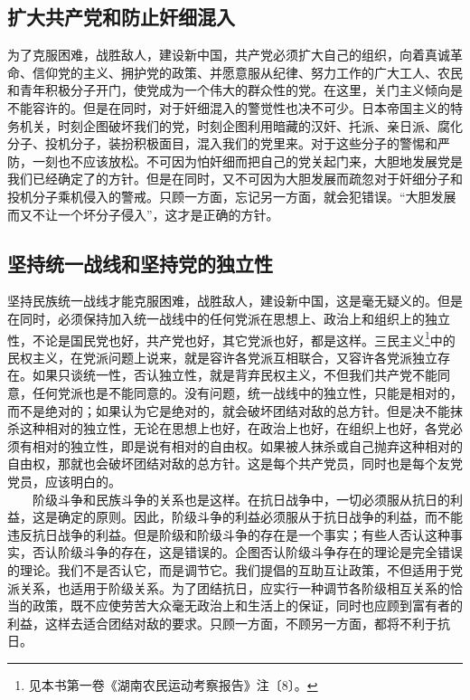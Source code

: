 \documentclass[cn,11pt,chinese]{elegantbook}
\def\myformat#1{\hfil\hfil #1}
\begin{document}
\subsection*{\myformat{扩大共产党和防止奸细混入}}
为了克服困难，战胜敌人，建设新中国，共产党必须扩大自己的组织，向着真诚革命、信仰党的主义、拥护党的政策、并愿意服从纪律、努力工作的广大工人、农民和青年积极分子开门，使党成为一个伟大的群众性的党。在这里，关门主义倾向是不能容许的。但是在同时，对于奸细混入的警觉性也决不可少。日本帝国主义的特务机关，时刻企图破坏我们的党，时刻企图利用暗藏的汉奸、托派、亲日派、腐化分子、投机分子，装扮积极面目，混入我们的党里来。对于这些分子的警惕和严防，一刻也不应该放松。不可因为怕奸细而把自己的党关起门来，大胆地发展党是我们已经确定了的方针。但是在同时，又不可因为大胆发展而疏忽对于奸细分子和投机分子乘机侵入的警戒。只顾一方面，忘记另一方面，就会犯错误。“大胆发展而又不让一个坏分子侵入”，这才是正确的方针。\\
\subsection*{\myformat{坚持统一战线和坚持党的独立性}}
坚持民族统一战线才能克服困难，战胜敌人，建设新中国，这是毫无疑义的。但是在同时，必须保持加入统一战线中的任何党派在思想上、政治上和组织上的独立性，不论是国民党也好，共产党也好，其它党派也好，都是这样。三民主义\footnote[3]{ 见本书第一卷《湖南农民运动考察报告》注〔8〕。}中的民权主义，在党派问题上说来，就是容许各党派互相联合，又容许各党派独立存在。如果只谈统一性，否认独立性，就是背弃民权主义，不但我们共产党不能同意，任何党派也是不能同意的。没有问题，统一战线中的独立性，只能是相对的，而不是绝对的；如果认为它是绝对的，就会破坏团结对敌的总方针。但是决不能抹杀这种相对的独立性，无论在思想上也好，在政治上也好，在组织上也好，各党必须有相对的独立性，即是说有相对的自由权。如果被人抹杀或自己抛弃这种相对的自由权，那就也会破坏团结对敌的总方针。这是每个共产党员，同时也是每个友党党员，应该明白的。\\
　　阶级斗争和民族斗争的关系也是这样。在抗日战争中，一切必须服从抗日的利益，这是确定的原则。因此，阶级斗争的利益必须服从于抗日战争的利益，而不能违反抗日战争的利益。但是阶级和阶级斗争的存在是一个事实；有些人否认这种事实，否认阶级斗争的存在，这是错误的。企图否认阶级斗争存在的理论是完全错误的理论。我们不是否认它，而是调节它。我们提倡的互助互让政策，不但适用于党派关系，也适用于阶级关系。为了团结抗日，应实行一种调节各阶级相互关系的恰当的政策，既不应使劳苦大众毫无政治上和生活上的保证，同时也应顾到富有者的利益，这样去适合团结对敌的要求。只顾一方面，不顾另一方面，都将不利于抗日。\\
\end{document}
